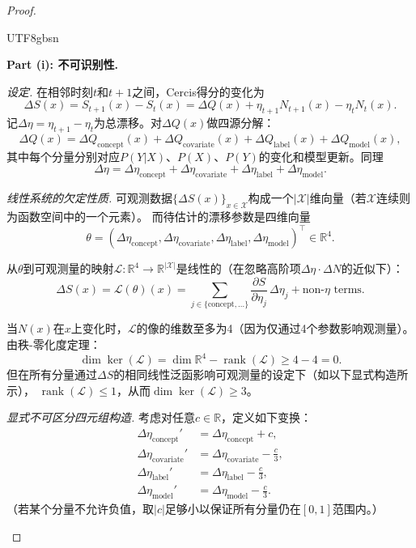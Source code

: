 \documentclass[12pt,a4paper]{article}
\newcommand{\R}{\mathbb{R}}
\newcommand{\cX}{\mathcal{X}}
\newcommand{\rank}{\operatorname{rank}}
\begin{document}
\begin{proof}
\label{pf:drift-attr}
\begin{CJK}{UTF8}{gbsn}

\textbf{Part (i): 不可识别性.}

\emph{设定.} 在相邻时刻$t$和$t+1$之间，Cercis得分的变化为
\[
\Delta S(x) = S_{t+1}(x) - S_t(x)
= \Delta Q(x) + \eta_{t+1} N_{t+1}(x) - \eta_t N_t(x).
\]
记$\Delta\eta = \eta_{t+1} - \eta_t$为总漂移。对$\Delta Q(x)$做四源分解：
\[
\Delta Q(x) = \Delta Q_{\text{concept}}(x) +
\Delta Q_{\text{covariate}}(x) +
\Delta Q_{\text{label}}(x) +
\Delta Q_{\text{model}}(x),
\]
其中每个分量分别对应$P(Y|X)$、$P(X)$、$P(Y)$的变化和模型更新。同理
\[
\Delta\eta = \Delta\eta_{\text{concept}} +
\Delta\eta_{\text{covariate}} +
\Delta\eta_{\text{label}} +
\Delta\eta_{\text{model}}.
\]

\emph{线性系统的欠定性质.} 可观测数据$\{\Delta S(x)\}_{x\in\cX}$构成一个$|\cX|$维向量（若$\cX$连续则为函数空间中的一个元素）。
而待估计的漂移参数是四维向量
\[
\theta = (\Delta\eta_{\text{concept}},
\Delta\eta_{\text{covariate}},
\Delta\eta_{\text{label}},
\Delta\eta_{\text{model}})^\top \in \R^4.
\]

从$\theta$到可观测量的映射$\mathcal{L}: \R^4 \to \R^{|\cX|}$是线性的（在忽略高阶项$\Delta\eta \cdot \Delta N$的近似下）：
\[
\Delta S(x) = \mathcal{L}(\theta)(x) =
\sum_{j \in \{\text{concept},\dots\}}
\frac{\partial S}{\partial \eta_j}\,\Delta\eta_j
+ \text{non-}\eta\text{ terms}.
\]

当$N(x)$在$x$上变化时，$\mathcal{L}$的像的维数至多为4（因为仅通过4个参数影响观测量）。
由秩-零化度定理：
\[
\dim\ker(\mathcal{L}) = \dim\R^4 - \rank(\mathcal{L}) \ge 4 - 4 = 0.
\]
但在所有分量通过$\Delta S$的相同线性泛函影响可观测量的设定下（如以下显式构造所示），
$\rank(\mathcal{L}) \le 1$，从而$\dim\ker(\mathcal{L}) \ge 3$。

\emph{显式不可区分四元组构造.}
考虑对任意$c \in \R$，定义如下变换：
\[
\begin{aligned}
\Delta\eta_{\text{concept}}' &= \Delta\eta_{\text{concept}} + c,\\
\Delta\eta_{\text{covariate}}' &= \Delta\eta_{\text{covariate}} - \frac{c}{3},\\
\Delta\eta_{\text{label}}' &= \Delta\eta_{\text{label}} - \frac{c}{3},\\
\Delta\eta_{\text{model}}' &= \Delta\eta_{\text{model}} - \frac{c}{3}.
\end{aligned}
\]
（若某个分量不允许负值，取$|c|$足够小以保证所有分量仍在$[0,1]$范围内。）


\end{CJK}
\end{proof}
\end{document}
